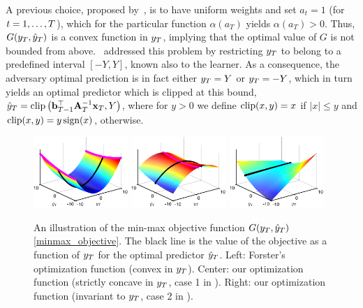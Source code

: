 A previous choice, proposed by~\cite{Forster}, is to have uniform weights
and set $a_t=1$ (for $t=1 , \ldots , T$), which for the particular function $\alpha(a_T)$
yields $\alpha(a_T)>0$. Thus, $G(y_{T},\hat{y}_{T})$ is a convex function
in $y_{T}$, implying that the optimal value of $G$ is not bounded
from above.~\cite{Forster} addressed this problem by restricting
$y_{T}$ to belong to a predefined interval $[-Y,Y]$, known also to
the learner. As a consequence, the adversary optimal prediction is in
fact either $y_{T}=Y$ or $y_{T}=-Y$, which in turn yields an optimal
predictor which is clipped at this bound, \(
\hat{y}_{T}={\rm clip}\left(\mathbf{b}_{T-1}^{\top}\mathbf{A}_{T}^{-1}\mathbf{x}_{T},Y\right)\),
where for $y>0$ we define ${\rm clip}(x,y)=x$ if $\vert x \vert \leq y$ and
${\rm clip}(x,y) =y\, {\rm sign}(x)$, otherwise.
%
\begin{figure}[!t!]
\includegraphics[width=0.32\textwidth]{figs/forster_minmax}
\includegraphics[width=0.32\textwidth]{figs/my_minmax}
\includegraphics[width=0.32\textwidth]{figs/my_minmax_0}
\caption{
An illustration of the min-max objective function $G(y_{T},\hat{y}_{T})$
\eqref{minmax_objective}. The black line is the value of the objective
as a function of $y_{T}$ for the optimal predictor $\hat{y}_{T}$.
Left: Forster's optimization function (convex in $y_{T}$).
Center: our optimization function (strictly  concave in $y_{T}$,
case 1 in ).
Right: our optimization function (invariant to $y_{T}$, case 2 in ).}
\label{fig:minmax}
\end{figure}
%

